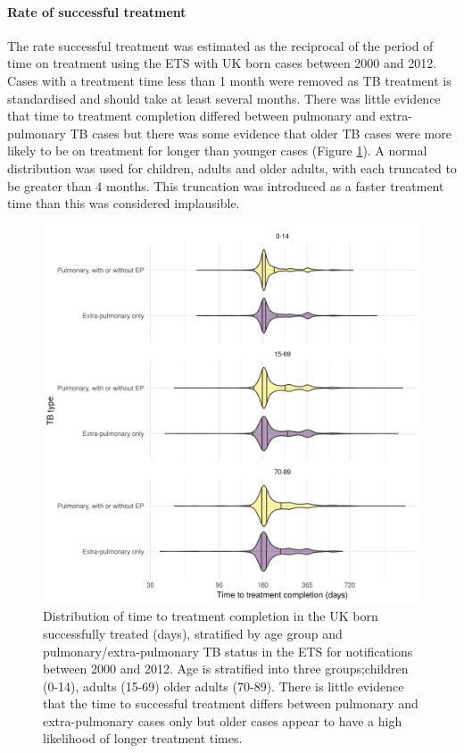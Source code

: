 \documentclass[11pt,twoside]{bristolthesis}
\begin{document}
  \hypertarget{rate-of-successful-treatment}{%
  \paragraph{Rate of successful treatment}\label{rate-of-successful-treatment}}
  
  The rate successful treatment was estimated as the reciprocal of the period of time on treatment using the ETS with UK born cases between 2000 and 2012. Cases with a treatment time less than 1 month were removed as TB treatment is standardised and should take at least several months. There was little evidence that time to treatment completion differed between pulmonary and extra-pulmonary TB cases but there was some evidence that older TB cases were more likely to be on treatment for longer than younger cases (Figure \ref{fig:tb-treat-time-succ}). A normal distribution was used for children, adults and older adults, with each truncated to be greater than 4 months. This truncation was introduced as a faster treatment time than this was considered implausible.
  \begin{figure}
  
  {\centering \includegraphics[width=0.8\linewidth,]{chapters/model-development/resources/figure/time_cure} 
  
  }
  
  \caption[Distribution of time to treatment completion in the UK born successfully treated (days), stratified by age group and pulmonary/extra-pulmonary TB status in the ETS for notifications between 2000 and 2012.]{Distribution of time to treatment completion in the UK born successfully treated (days), stratified by age group and pulmonary/extra-pulmonary TB status in the ETS for notifications between 2000 and 2012. Age is stratified into three groups;children (0-14), adults (15-69) older adults (70-89). There is little evidence that the time to successful treatment differs between pulmonary and extra-pulmonary cases only but older cases appear to have a high likelihood of longer treatment times.}\label{fig:tb-treat-time-succ}
  \end{figure}
\end{document}
